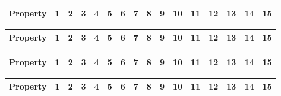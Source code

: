 \documentclass[11pt,a4paper,oneside]{article}
\begin{document}
\begin{tabular}{lccccccccccccccc}
\toprule
Property & 1 & 2 & 3 & 4 & 5 & 6 & 7 & 8 & 9 & 10 & 11 & 12 & 13 & 14 & 15 \\
\midrule

\bottomrule
\end{tabular}

\begin{tabular}{lccccccccccccccc}
\toprule
Property & 1 & 2 & 3 & 4 & 5 & 6 & 7 & 8 & 9 & 10 & 11 & 12 & 13 & 14 & 15 \\
\midrule

\bottomrule
\end{tabular}

\begin{tabular}{lccccccccccccccc}
\toprule
Property & 1 & 2 & 3 & 4 & 5 & 6 & 7 & 8 & 9 & 10 & 11 & 12 & 13 & 14 & 15 \\
\midrule

\bottomrule
\end{tabular}
\begin{tabular}{lccccccccccccccc}
\toprule
Property & 1 & 2 & 3 & 4 & 5 & 6 & 7 & 8 & 9 & 10 & 11 & 12 & 13 & 14 & 15 \\
\midrule

\bottomrule
\end{tabular}
\end{document}
